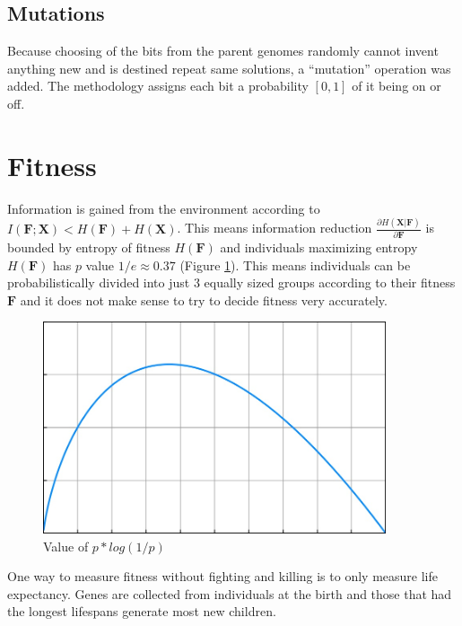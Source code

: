 \documentclass{article}
\begin{document}
\subsection{Mutations}

Because choosing of the bits from the parent genomes randomly cannot invent anything new and is destined repeat same solutions,
a ``mutation'' operation was added. The methodology assigns each bit a probability $[0,1]$ of it being on or off.


\section{Fitness} \label{fitness}

Information is gained from the environment according to $I(\mathbf{F};\mathbf{X}) < H(\mathbf{F})+H(\mathbf{X})$. This means information reduction   
$\frac{\partial H(\mathbf{X}|\mathbf{F})}{\partial \mathbf{F} }$
 is bounded by entropy of fitness $H(\mathbf{F})$ and individuals maximizing entropy $H(\mathbf{F})$ has $p$ value $1/e \approx 0.37$  (Figure \ref{fig:plogp}). This means individuals can be probabilistically divided into just 3 equally sized groups according to their fitness $\mathbf{F}$ and it does not make sense to try to decide fitness very accurately.

\begin{figure}

\centering
\includegraphics[keepaspectratio,width=0.9\textwidth]{plogp.jpg}

\caption{Value of $p*log(1/p)$}

\label{fig:plogp}

\end{figure}


One way to measure fitness without fighting and killing is to only  measure life expectancy. Genes are  collected from individuals at the birth and those that had the longest lifespans generate most new children.
\end{document}
